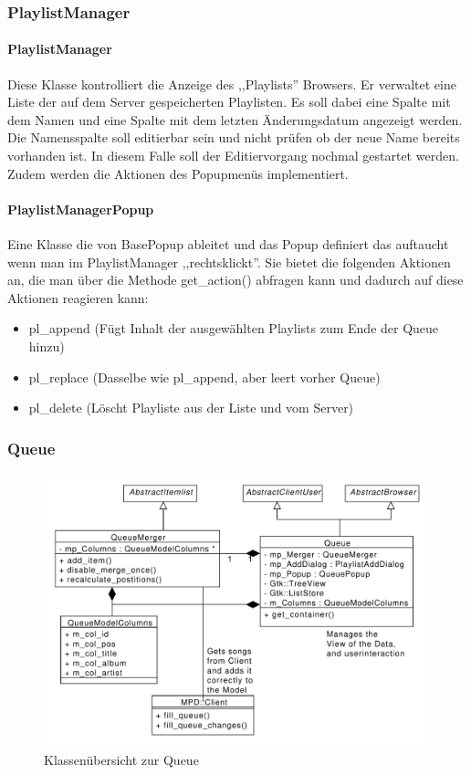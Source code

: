 \subsubsection{PlaylistManager}
\paragraph{PlaylistManager}
Diese Klasse kontrolliert die Anzeige des ,,Playlists'' Browsers. Er verwaltet eine Liste der auf dem Server gespeicherten Playlisten. Es soll dabei eine Spalte mit dem Namen und eine Spalte mit dem letzten Änderungsdatum angezeigt werden.
Die Namensspalte soll editierbar sein und nicht prüfen ob der neue Name bereits vorhanden ist. In diesem Falle soll der Editiervorgang nochmal gestartet werden.
Zudem werden die Aktionen des Popupmenüs implementiert.

\paragraph{PlaylistManagerPopup}
Eine Klasse die von BasePopup ableitet und das Popup definiert das auftaucht wenn man im PlaylistManager ,,rechtsklickt''.
Sie bietet die folgenden Aktionen an, die man über die Methode get\_action() abfragen kann und dadurch auf diese Aktionen reagieren kann:
\begin{itemize}
\item pl\_append (Fügt Inhalt der ausgewählten Playlists zum Ende der Queue hinzu)
\item pl\_replace (Dasselbe wie pl\_append, aber leert vorher Queue)
\item pl\_delete (Löscht Playliste aus der Liste und vom Server)
\end{itemize}

\subsubsection{Queue}
\begin{figure}[htb!]
	\centering
        \includegraphics[width=\textwidth]{QueueClass.pdf}
	\caption{Klassenübersicht zur Queue}
	\label{st_queue}
\end{figure}
\newpage
